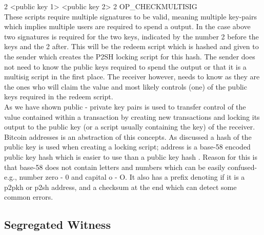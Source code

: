 2 <public key 1> <public key 2> 2 OP\_CHECKMULTISIG
\\

These scripts require multiple signatures to be valid, meaning multiple key-pairs which implies multiple users are required to spend a output.
In the case above two signatures is required for the two keys, indicated by the number 2 before the keys and the 2 after.
This will be the redeem script which is hashed and given to the sender which creates the P2SH locking script for this hash.
The sender does not need to know the public keys required to spend the output or that it is a multisig script in the first place. The receiver however, needs to know as they are the ones who will claim the value and most likely controls (one) of the public keys required in the redeem script.
\\

As we have shown public - private key pairs is used to transfer control of the value contained within a transaction by creating new transactions and locking its output to the public key (or a script usually containing the key) of the receiver. Bitcoin addresses is an abstraction of this concepts. As discussed a hash of the public key is used when creating a locking script; address is a base-58 encoded public key hash which is easier to use than a public key hash \cite{antonopoulos2017mastering}. Reason for this is that base-58 does not contain letters and numbers which can be easily confused-e.g., number zero - 0 and capital o - O. It also has a prefix denoting if it is a p2pkh or p2sh address, and a checksum at the end which can detect some common errors.

\subsection{Segregated Witness}
\label{subsec:segwit}

